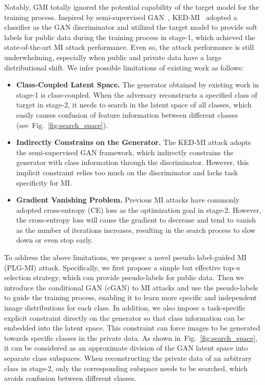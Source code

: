 \documentclass[letterpaper]{article} %
\newcommand{\Fref}[1]{Fig.~\ref{#1}}
\begin{document}
    
Notably, GMI totally ignored the potential capability of the target model for the training process. Inspired by semi-supervised GAN~\cite{salimans2016improved}, KED-MI~\cite{chen2021knowledge} adopted a classifier as the GAN discriminator and utilized the target model to provide soft labels for public data during the training process in stage-1, which achieved the state-of-the-art MI attack performance. Even so, the attack performance is still underwhelming, especially when public and private data have a large distributional shift. We infer possible limitations of existing work as follows:
\begin{itemize}
    \item [1)] \textbf{Class-Coupled Latent Space.}
    The generator obtained by existing work in stage-1 is class-coupled. When the adversary reconstructs a specified class of target in stage-2, it needs to search in the latent space of all classes, which easily causes confusion of feature information between different classes (see~\Fref{fig:search_space}).
    \item [2)] \textbf{Indirectly Constrains on the Generator.}
    The KED-MI attack adopts the semi-supervised GAN framework, which indirectly constrains the generator with class information through the discriminator. However, this implicit constraint relies too much on the discriminator and lacks task specificity for MI.
    \item [3)]\textbf{Gradient Vanishing Problem.}
    Previous MI attacks have commonly adopted cross-entropy (CE) loss as the optimization goal in stage-2. However, the cross-entropy loss will cause the gradient to decrease and tend to vanish as the number of iterations increases, resulting in the search process to slow down or even stop early.
\end{itemize} 
    
    
To address the above limitations, we propose a novel pseudo label-guided MI (PLG-MI) attack. Specifically, we first propose a simple but effective top-\emph{n} selection strategy, which can provide pseudo-labels for public data. Then we introduce the conditional GAN (cGAN) to MI attacks and use the pseudo-labels to guide the training process, enabling it to learn more specific and independent image distributions for each class. In addition, we also impose a task-specific explicit constraint directly on the generator so that class information can be embedded into the latent space. This constraint can force images to be generated towards specific classes in the private data. As shown in~\Fref{fig:search_space}, it can be considered as an approximate division of the GAN latent space into separate class subspaces. When reconstructing the private data of an arbitrary class in stage-2, only the corresponding subspace needs to be searched, which avoids confusion between different classes.
\end{document}
